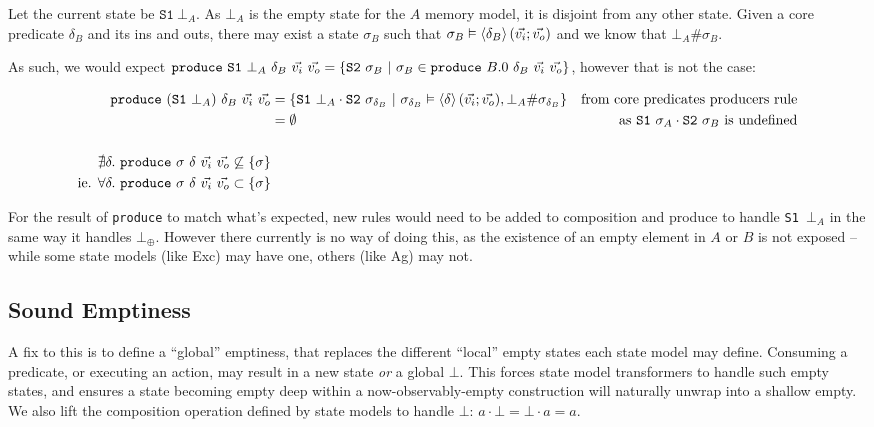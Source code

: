 \documentclass[,a4paper,oneside]{article}
\newcommand{\code}[1]{\texttt{#1}}
\begin{document}
Let the current state be $\code{S1}~\bot_A$. As $\bot_A$ is the empty state for the $A$ memory model, it is disjoint from any other state. Given a core predicate $\delta_B$ and its ins and outs, there may exist a state $\sigma_B$ such that $\sigma_B\vDash \left<\texttt{$\delta_B$}\right>(\vec{v_i};\vec{v_o})$ and we know that $\bot_A \# \sigma_B$. 

As such, we would expect $\code{produce}~\code{S1}~\bot_A~\delta_B~\ins~\outs = \{\code{S2}~\sigma_B~|~\sigma_B\in \code{produce}~B.0~ \delta_B~\ins~\outs \}$, however that is not the case:

\begin{align*}
	\code{produce}~(\code{S1}~\bot_A)~\delta_B~\ins~\outs
	&=\{\code{S1}~\bot_A\cdot\code{S2}~\sigma_{\delta_B}~|~\sigma_{\delta_B}\vDash\corepred{$\delta$}{\ins}{\outs},\bot_A\#\sigma_{\delta_B}\}&\text{from core predicates producers rule}\\
	&=\emptyset &\text{as }\code{S1}~\sigma_A\cdot\code{S2}~\sigma_B\text{ is undefined}\\~\\
	~
	\nexists \delta.~\code{produce}~\sigma~\delta~\ins~\outs\not\subseteq \{\sigma\}\\
	\text{ie. }\forall \delta.~\code{produce}~\sigma~\delta~\ins~\outs\subset\{\sigma\}
\end{align*}

For the result of \code{produce} to match what's expected, new rules would need to be added to composition and produce to handle \code{S1~$\bot_A$} in the same way it handles $\bot_\oplus$. However there currently is no way of doing this, as the existence of an empty element in $A$ or $B$ is not exposed -- while some state models (like Exc) may have one, others (like Ag) may not.

\subsection{Sound Emptiness}

A fix to this is to define a ``global'' emptiness, that replaces the different ``local'' empty states each state model may define. Consuming a predicate, or executing an action, may result in a new state {\it or} a global $\bot$. This forces state model transformers to handle such empty states, and ensures a state becoming empty deep within a now-observably-empty construction will naturally unwrap into a shallow empty. We also lift the composition operation defined by state models to handle $\bot$: $a \cdot \bot = \bot \cdot a = a$.
\end{document}

